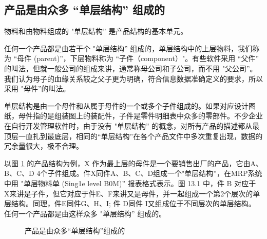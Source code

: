 \subsection {产品是由众多 “单层结构” 组成的}

    物料和由物料组成的 "单层结构” 是产品结构的基本单元。

    任何一个产品都是由若干个 "单层结构” 组成的，单层结构中的上层物料，我们称为 “母件 (parent)”，下层物料称为 “子件（component）"。有些软件采用 “父件” 的叫法，但就一般公司的组成来讲，通常称母公司和子公司，而不用 "父公司”。我们认为母子的血缘关系较之父子更为明确，符合信息数据准确定义的要求，所以采用 "母件”的叫法。

    单层结构是由一个母件和从属于母件的一个或多个子件组成的。如果对应设计图纸，母件指的是组装图上的装配件，子件是零件明细表中众多的零部件。不少企业在自行开发管理软件时，由于没有 "单层结构” 的概念，对所有产品的描述都从最顶层一直扎到最底层，相同的“单层结构”在各个产品文件中多次重复出现，数据的冗余量很大，极不合理。

    以图 \ref{fig:bomBySimples} 的产品结构为例，X 作为最上层的母件是一个要销售出厂的产品，它由A、B、C、D 4个子件组成。件X同件A、B、C、D组成一个"单层结构”，在MRP系统中用 "单层物料单 (Sing1e level B0M)” 报表格式表示。图 13.1 中，件 B 对应于 X来讲是子件，但它对应于件E、F来讲又是母件，并一起组成一个第2个层次的单层结构。同理，件E同件G、H、I; 件 D同件 I又组成位于不同层次的单层结构。 任何一个产品都是由这样众多 "单层结构” 组成的。

    \begin{figure}[!htbp]
        \centering
        \caption{产品是由众多“单层结构”组成的} \label{fig:bomBySimples}
    \end{figure}

